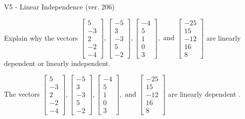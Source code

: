 \begin{exercise}
  \begin{exerciseTitle}V5 - Linear Independence (ver. 206)\end{exerciseTitle}
  \begin{exerciseStatement}
    Explain why the vectors \(\left[\begin{array}{r}
5 \\
-3 \\
2 \\
-2 \\
-4
\end{array}\right] , \left[\begin{array}{r}
-5 \\
3 \\
-3 \\
5 \\
-2
\end{array}\right] , \left[\begin{array}{r}
-4 \\
5 \\
1 \\
0 \\
3
\end{array}\right] , \text{ and } \left[\begin{array}{r}
-25 \\
15 \\
-12 \\
16 \\
8
\end{array}\right]\) are linearly dependent or linearly independent.	


  \end{exerciseStatement}
  \begin{exerciseAnswer}
   The vectors \(\left[\begin{array}{r}
5 \\
-3 \\
2 \\
-2 \\
-4
\end{array}\right] , \left[\begin{array}{r}
-5 \\
3 \\
-3 \\
5 \\
-2
\end{array}\right] , \left[\begin{array}{r}
-4 \\
5 \\
1 \\
0 \\
3
\end{array}\right] , \text{ and } \left[\begin{array}{r}
-25 \\
15 \\
-12 \\
16 \\
8
\end{array}\right]\) are 
  	 linearly dependent  .
  


  \end{exerciseAnswer}
\end{exercise}